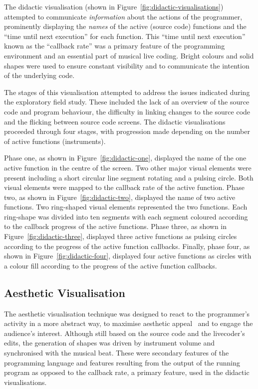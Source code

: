 The didactic visualisation (shown in Figure~\ref{fig:didactic-visualisations}) attempted to communicate \emph{information} about the actions of the programmer, prominently displaying the \emph{names} of the active (source code) functions and the ``time until next execution'' for each function. This ``time until next execution'' known as the ``callback rate'' was a primary feature of the programming environment and an essential part of musical live coding. Bright colours and solid shapes were used to ensure constant visibility and to communicate the intention of the underlying code. 

The stages of this visualisation attempted to address the issues indicated during the exploratory field study. These included the lack of an overview of the source code and program behaviour, the difficulty in linking changes to the source code and the flicking between source code screens. The didactic visualisations proceeded through four stages, with progression made depending on the number of active functions (instruments).

Phase one, as shown in Figure~\ref{fig:didactic-one}, displayed the name of the one active function in the centre of the screen. Two other major visual elements were present including a short circular line segment rotating and a pulsing circle. Both visual elements were mapped to the callback rate of the active function. Phase two, as shown in Figure~\ref{fig:didactic-two}, displayed the name of two active functions. Two ring-shaped visual elements represented the two functions. Each ring-shape was divided into ten segments with each segment coloured according to the callback progress of the active functions. Phase three, as shown in Figure~\ref{fig:didactic-three}, displayed three active functions as pulsing circles according to the progress of the active function callbacks. Finally, phase four, as shown in Figure~\ref{fig:didactic-four}, displayed four active functions as circles with a colour fill according to the progress of the active function callbacks.

\subsection{Aesthetic Visualisation}
\label{sec:aesthetic-visualisation}



The aesthetic visualisation technique was designed to react to the programmer's activity in a more abstract way, to maximise aesthetic appeal~\cite{Cawthon2007} and to engage the audience's interest. Although still based on the source code and the livecoder's edits, the generation of shapes was driven by instrument volume and synchronised with the musical beat. These were secondary features of the programming language and features resulting from the output of the running program as opposed to the callback rate, a primary feature, used in the didactic visualisations.


